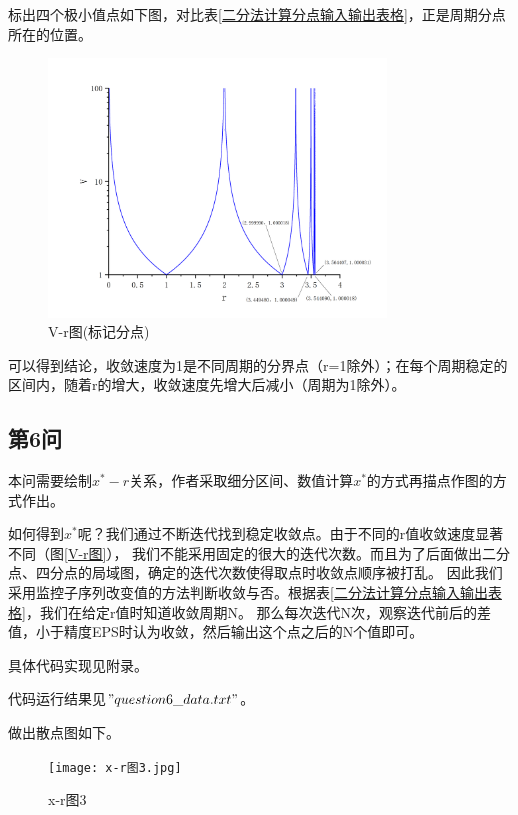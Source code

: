 \documentclass[10pt, a4paper]{article}
\begin{document}
    标出四个极小值点如下图，对比表\ref{二分法计算分点输入输出表格}，正是周期分点所在的位置。

    \begin{figure}[H]
        \centering
        \includegraphics[width=0.8\textwidth]{V-r图(标记分点).jpg}
        \caption{V-r图(标记分点)}\label{V-r图(标记分点)}
    \end{figure}

    可以得到结论，收敛速度为1是不同周期的分界点（r=1除外）；在每个周期稳定的区间内，随着r的增大，收敛速度先增大后减小（周期为1除外）。
    
    \subsection{第6问}

    本问需要绘制$x^*-r$关系，作者采取细分区间、数值计算$x^*$的方式再描点作图的方式作出。

    如何得到$x^*$呢？我们通过不断迭代找到稳定收敛点。由于不同的r值收敛速度显著不同（图\ref{V-r图}），
    我们不能采用固定的很大的迭代次数。而且为了后面做出二分点、四分点的局域图，确定的迭代次数使得取点时收敛点顺序被打乱。
    因此我们采用监控子序列改变值的方法判断收敛与否。根据表\ref{二分法计算分点输入输出表格}，我们在给定r值时知道收敛周期N。
    那么每次迭代N次，观察迭代前后的差值，小于精度EPS时认为收敛，然后输出这个点之后的N个值即可。

    具体代码实现见附录。

    代码运行结果见$"question6\_data.txt"$。

    做出散点图如下。

    \begin{figure}[H]
        \centering
        \texttt{[image: x-r图3.jpg]}
        \caption{x-r图3}\label{x-r图3}
    \end{figure}
\end{document}
